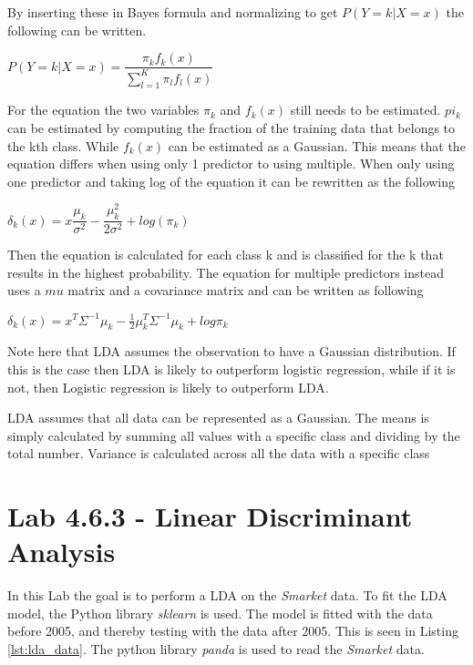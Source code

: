 By inserting these in Bayes formula and normalizing to get $P(Y=k|X=x)$ the following can be written.

\begin{center}
	$P(Y=k|X = x) = \dfrac{\pi_k f_k(x)}{\sum_{l=1}^{K} \pi_l f_l(x)}$
\end{center}

For the equation the two variables $\pi_k$ and $f_k(x)$ still needs to be estimated. $pi_k$ can be estimated by computing the fraction of the training data that belongs to the kth class. While $f_k(x)$ can be estimated as a Gaussian. This means that the equation differs when using only 1 predictor to using multiple. When only using one predictor and taking log of the equation it can be rewritten as the following

\begin{center}
	$\delta_k(x) = x  \dfrac{\mu_k}{\sigma^2} - \dfrac{\mu_k^2}{2\sigma^2} + log(\pi_k)$
\end{center}

Then the equation is calculated for each class k and is classified for the k that results in the highest probability. The equation for multiple predictors instead uses a $mu$ matrix and a covariance matrix and can be written as following

\begin{center}
	$\delta_k(x) = x^T \Sigma^{-1} \mu_k -  \frac{1}{2} \mu_k^{T} \Sigma^{-1} \mu_k + log \pi_k$
\end{center}

Note here that LDA assumes the observation to have a Gaussian distribution. If this is the case then LDA is likely to outperform logistic regression, while if it is not, then Logistic regression is likely to outperform LDA.

LDA assumes that all data can be represented as a Gaussian. 
The means is simply calculated by summing all values with a specific class and dividing by the total number.
Variance is calculated across all the data with a specific class 


\section{Lab 4.6.3 - Linear Discriminant Analysis}
In this Lab the goal is to perform a LDA on the \emph{Smarket} data. To fit the LDA model, the Python library \emph{sklearn} is used. The model is fitted with the data before 2005, and thereby testing with the data after 2005. This is seen in Listing \ref{lst:lda_data}. The python library \emph{panda} is used to read the \emph{Smarket} data. 


